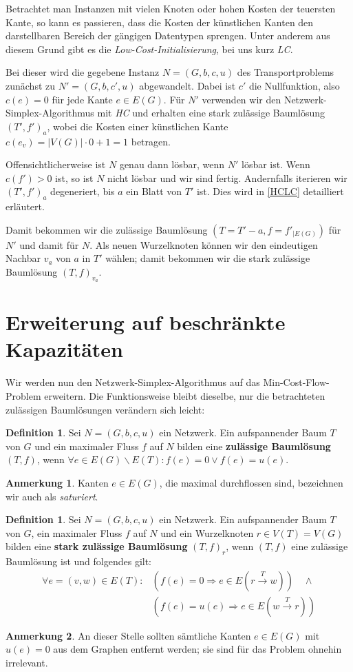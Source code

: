 \documentclass[a4paper,twoside,ngerman]{report}
\theoremstyle{plain}
\theoremstyle{definition}
\newtheorem{defn}[thm]{Definition}
\newtheorem*{anm}{Anmerkung}
\begin{document}
Betrachtet man Instanzen mit vielen Knoten oder hohen Kosten der teuersten Kante, so kann es passieren, dass die Kosten der künstlichen Kanten den darstellbaren Bereich der gängigen Datentypen sprengen. Unter anderem aus diesem Grund gibt es die \emph{Low-Cost-Initialisierung}, bei uns kurz \emph{LC}.

Bei dieser wird die gegebene Instanz $N=(G,b,c,u)$ des Transportproblems zunächst zu $N'=(G,b,c',u)$ abgewandelt. Dabei ist $c'$ die Nullfunktion, also $c(e)=0$ für jede Kante $e\in E(G)$. Für $N'$ verwenden wir den Netzwerk-Simplex-Algorithmus mit \emph{HC} und erhalten eine stark zulässige Baumlösung $(T',f')_a$, wobei die Kosten einer künstlichen Kante $c(e_v)=|V(G)|\cdot0+1=1$ betragen.

Offensichtlicherweise ist $N$ genau dann lösbar, wenn $N'$ lösbar ist. Wenn $c(f')>0$ ist, so ist $N$ nicht lösbar und wir sind fertig. Andernfalls iterieren wir $(T',f')_a$ degeneriert, bis $a$ ein Blatt von $T'$ ist. Dies wird in \cref{HCLC} detailliert erläutert.

Damit bekommen wir die zulässige Baumlösung $(T=T'-a, f=f'_{|E(G)})$ für $N'$ und damit für $N$. Als neuen Wurzelknoten können wir den eindeutigen Nachbar $v_a$ von $a$ in $T'$ wählen; damit bekommen wir die stark zulässige Baumlösung $(T,f)_{v_a}$.

\section{Erweiterung auf beschränkte Kapazitäten}\label{ch:alg2}
Wir werden nun den Netzwerk-Simplex-Algorithmus auf das Min-Cost-Flow-Problem erweitern. Die Funktionsweise bleibt dieselbe, nur die betrachteten zulässigen Baumlösungen verändern sich leicht:

\begin{defn}Sei $N=(G,b,c,u)$ ein Netzwerk. Ein aufspannender Baum $T$ von $G$ und ein maximaler Fluss $f$ auf $N$ bilden eine \textbf{zulässige Baumlösung} $(T,f)$, wenn $\forall e\in E(G)\backslash E(T): f(e) = 0\vee f(e)=u(e)$.\end{defn}
\begin{anm}Kanten $e\in E(G)$, die maximal durchflossen sind, bezeichnen wir auch als \emph{saturiert}.\end{anm}

\begin{defn}Sei $N=(G,b,c,u)$ ein Netzwerk. Ein aufspannender Baum $T$ von $G$, ein maximaler Fluss $f$ auf $N$ und ein Wurzelknoten $r\in V(T)=V(G)$ bilden eine \textbf{stark zulässige Baumlösung} $(T,f)_r$, wenn $(T,f)$ eine zulässige Baumlösung ist und folgendes gilt:
\begin{align*}
\forall e=(v,w)\in E(T): &{}(f(e)=0 \Rightarrow e\in E(r\xrightarrow{T}w))\quad\wedge\\
&{}(f(e)=u(e) \Rightarrow e\in E(w\xrightarrow{T}r))
\end{align*}\end{defn}
\begin{anm}An dieser Stelle sollten sämtliche Kanten $e\in E(G)$ mit $u(e)=0$ aus dem Graphen entfernt werden; sie sind für das Problem ohnehin irrelevant.\end{anm}
\end{document}
